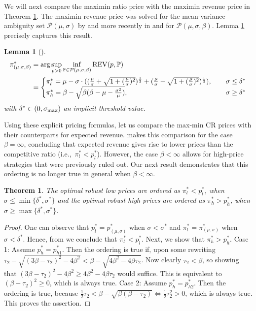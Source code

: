 \documentclass[11pt]{article}
\newtheorem{theorem}{Theorem}[section]
\newtheorem{lemma}{Lemma}[section]
\newcommand{\bP}{\mathbb{P}}
\newcommand{\cP}{\mathcal{P}}
\newcommand{\1}{\mathds{1}}
\begin{document}
We will next compare the maximin ratio price with the maximin revenue price in Theorem \ref{th:2prices}. The maximin revenue price was solved for the mean-variance ambiguity set $\cP(\mu,\sigma)$ by \cite{azar2012optimal} and more recently in \cite{suzdaltsev2020distributionally} and \cite{van2024robust} for $\cP(\mu,\sigma,\beta)$. Lemma \ref{lem:rev_price} precisely captures this result.
\begin{lemma}[\cite{azar2012optimal,suzdaltsev2020distributionally,van2024robust}]\label{lem:rev_price}
\begin{align}
\pi^*_{(\mu,\sigma,\beta)}&=\arg\sup_{p>0}\inf_{\bP\in\cP(\mu,\sigma,\beta)}\textup{REV}(p,\bP) \nonumber \\ &=\begin{cases}
            \pi^*_l = \mu - \sigma \cdot \large(\large(\tfrac{\mu}{\sigma}+\sqrt{1+(\tfrac{\mu}{\sigma})^2}\large)^{\frac{1}{3}} + \large(\tfrac{\mu}{\sigma}-\sqrt{1+(\tfrac{\mu}{\sigma})^2}\large)^{\frac{1}{3}}\large), \quad &  \sigma \leq \delta^{*} \\
            \pi^*_h = \beta - \sqrt{\beta(\beta-\mu-\frac{\sigma^2}{\mu})}, \quad & \sigma \geq \delta^{*}
        \end{cases}
\end{align}
with $\delta^* \in (0,\sigma_{\textup{max}})$ an implicit threshold value. 
\end{lemma}

Using these explicit pricing formulas, let us compare the max-min CR prices with their counterparts for expected revenue. \cite{chen2022distribution} makes this comparison for the case $\beta = \infty$, concluding that expected revenue gives rise to lower prices than the competitive ratio (i.e.,~$\pi^*_l < p^*_l$). However, the case $\beta < \infty$ allows for high-price strategies that were previously ruled out. Our next result demonstrates that this ordering is no longer true in general when $\beta < \infty$.
\begin{theorem}\label{th:2prices}
The optimal robust low prices are ordered as
    $\pi^*_l < p^*_l$, when $\sigma \leq \min\{\delta^*,\sigma^*\}$ and the optimal robust high prices are ordered as $\pi^*_h > p^*_h$, when $\sigma \geq \max\{\delta^*,\sigma^*\}$.
\end{theorem}
\begin{proof}
    One can observe that $p^*_l = p^*_{(\mu,\sigma)}$ when $\sigma < \sigma^*$ and $\pi^*_l = \pi^*_{(\mu,\sigma)}$ when $\sigma < \delta^*$. Hence, from \cite{chen2022distribution} we conclude that $\pi^*_l < p^*_l$. Next, we show that $\pi_h^* > p^*_h$. 
    Case 1: Assume $p^*_h = p^*_{h1}$. Then the ordering is true if, upon some rewriting $\tau_2 - \sqrt{(3\beta-\tau_2)^2-4\beta^2} < \beta - \sqrt{4\beta^2-4\beta\tau_2}$. Now clearly $\tau_2 < \beta$, so showing that $(3\beta-\tau_2)^2-4\beta^2 \geq 4\beta^2-4\beta\tau_2$ would suffice. This is equivalent to $(\beta-\tau_2)^2 \geq 0$, which is always true.
    Case 2: Assume $p^*_h = p^*_{h2}$. Then the ordering is true, because $\frac{1}{2}\tau_2 < \beta - \sqrt{\beta(\beta-\tau_2)} \iff \frac{1}{2}\tau_2^2 > 0$, which is always true. This proves the assertion.
\end{proof}
\end{document}
